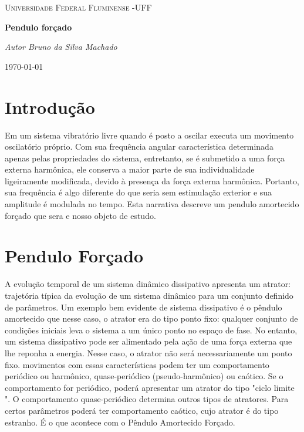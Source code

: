 \documentclass[dvipsnames,a4paper,11pt]{article}
\begin{document}

\author{Bruno da silva}

\selectfont
\begin{titlepage}
	\begin{center}
		{\scshape\Large Universidade Federal Fluminense -UFF \par}
		\vspace{7cm}
		{\huge\bfseries Pendulo forçado \par}
		\vspace{5.5cm}
		{\itshape Autor Bruno da Silva Machado \par}      
			
		\vspace{6.5cm}    
			
		\vfill
		{\large \today\par}
	\end{center}
\end{titlepage}

\setcounter{secnumdepth}{0}
\section{Introdu\c{c}\~{a}o}
\noindent

Em  um sistema vibratório livre quando é posto a oscilar executa um movimento oscilatório próprio. Com sua frequência angular característica determinada apenas pelas propriedades do sistema, entretanto, se é submetido a uma força externa harmônica, ele conserva a maior parte de sua individualidade ligeiramente modificada, devido à presença da força externa harmônica. Portanto, sua frequência é algo diferente do que seria sem estimulação exterior e sua amplitude é modulada no tempo. Esta narrativa descreve um pendulo amortecido forçado que sera e nosso objeto de estudo.
\noindent \eject 

\section{Pendulo Forçado}
\noindent 

A evolução temporal de um sistema dinâmico dissipativo apresenta um atrator: trajetória típica da evolução de um sistema dinâmico para um conjunto definido de parâmetros. Um exemplo bem evidente de sistema dissipativo é o pêndulo amortecido que nesse caso, o atrator era do tipo ponto fixo: qualquer conjunto de condições iniciais leva o sistema a um único ponto no espaço de fase.  
No entanto, um sistema dissipativo pode ser alimentado pela ação de uma força externa que lhe reponha a energia. Nesse caso, o atrator não será necessariamente um ponto fixo. movimentos com essas características podem ter um comportamento periódico ou harmônico, quase-periódico (pseudo-harmônico) ou caótico.  Se o comportamento for periódico, poderá apresentar um atrator do tipo "ciclo limite ". O comportamento quase-periódico determina outros tipos de atratores. Para certos parâmetros poderá ter comportamento caótico, cujo atrator é do tipo estranho. É o que acontece com o Pêndulo Amortecido Forçado.
\end{document}
